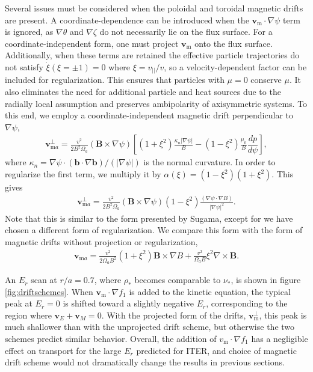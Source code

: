 \documentclass[aip, pop, preprint]{revtex4-1}
\numberwithin{figure}{section}
\numberwithin{equation}{section}
\newcommand{\der}[2]{\dfrac{d #1}{d  #2}}
\begin{document}
Several issues must be considered when the poloidal and toroidal magnetic drifts are present. A coordinate-dependence can be introduced when the $\bm{v}_{\text{m}} \cdot \nabla \psi$ term is ignored, as $\nabla \theta$ and $\nabla \zeta$ do not necessarily lie on the flux surface. For a coordinate-independent form, one must project $\bm{v}_{\text{m}}$ onto the flux surface. Additionally, when these terms are retained the effective particle trajectories do not satisfy $\dot{\xi} (\xi = \pm 1) = 0$ where $\xi = v_{||}/v$, so a velocity-dependent factor can be included for regularization.  This ensures that particles with $\mu = 0$ conserve $\mu$. It also eliminates the need for additional particle and heat sources due to the radially local assumption and preserves ambipolarity of axisymmetric systems.\cite{Sugama2016} To this end, we employ a coordinate-independent magnetic drift perpendicular to $\nabla \psi$,
\begin{gather}
\bm{v}_{\text{m}a}^{\perp} = \frac{v^2}{2B^2 \Omega_a} (\bm{B} \times \nabla \psi) \left[(1+\xi^2) \frac{\kappa_n \rvert \nabla \psi \rvert}{B} - (1 - \xi^2) \frac{\mu_0}{B} \der{p}{\psi} \right],
\end{gather}
where $\kappa_n = \nabla \psi \cdot (\bm{b} \cdot \nabla \bm{b})/(\rvert \nabla \psi \rvert)$ is the normal curvature. In order to regularize the first term, we multiply it by $\alpha(\xi) = (1-\xi^2)(1+\xi^2)$. This gives
\begin{gather}
\bm{v}_{\text{m}a}^{\perp} = \frac{v^2}{2B^2 \Omega_a} (\bm{B} \times \nabla \psi) (1 - \xi^2) \frac{(\nabla \psi \cdot \nabla B)}{\rvert \nabla \psi \rvert^2}.
\end{gather}
Note that this is similar to the form presented by Sugama,\cite{Sugama2016} except for we have chosen a different form of regularization. We compare this form with the form of magnetic drifts without projection or regularization,
\begin{gather}
\bm{v}_{\text{m}a} = \frac{v^2}{2 \Omega_a B^2} (1 + \xi^2) \bm{B} \times \nabla B + \frac{v^2}{\Omega_a B} \xi^2 \nabla \times \bm{B}.
\end{gather}

An $E_r$ scan at $r/a = 0.7$, where $\rho_*$ becomes comparable to $\nu_*$, is shown in figure \ref{fig:driftschemes}. When $\bm{v}_{\text{m}} \cdot \nabla f_1$ is added to the kinetic equation, the typical peak at $E_r = 0$ is shifted toward a slightly negative $E_r$, corresponding to the region where $\bm{v}_E + \bm{v}_M = 0$. With the projected form of the drifts, $\bm{v}_{\text{m}}^{\perp}$, this peak is much shallower than with the unprojected drift scheme, but otherwise the two schemes predict similar behavior. Overall, the addition of $v_{\text{m}} \cdot \nabla f_1$ has a negligible effect on transport for the large $E_r$ predicted for ITER, and choice of magnetic drift scheme would not dramatically change the results in previous sections.  
\end{document}
